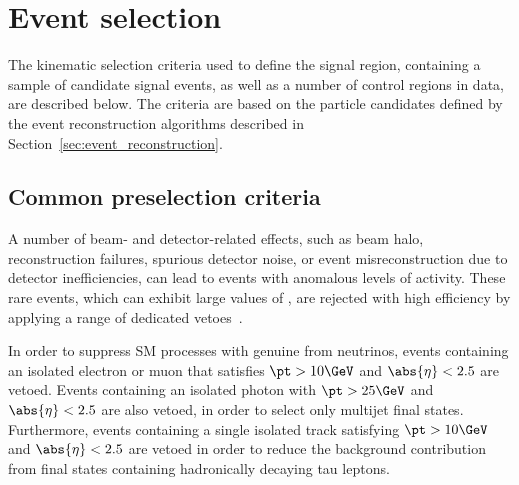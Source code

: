 \section{Event selection}
\label{sec:event_selection}

The kinematic selection criteria used to define the signal region,
containing a sample of candidate signal events, as well as a number of
control regions in data, are described below. The criteria are based
on the particle candidates defined by the event reconstruction
algorithms described in Section~\ref{sec:event_reconstruction}.

\subsection{Common preselection criteria}
\label{sec:preselection}

A number of beam- and detector-related effects, such as beam halo,
reconstruction failures, spurious detector noise, or event
misreconstruction due to detector inefficiencies, can lead to events
with anomalous levels of activity. These rare events, which can
exhibit large values of \ETmiss, are rejected with high efficiency by
applying a range of dedicated vetoes~\cite{1748-0221-5-03-T03014,
  cms-met}.

In order to suppress SM processes with genuine \ptvecmiss from
neutrinos, events containing an isolated electron or muon that
satisfies $\pt > 10\GeV$ and $\abs{\eta} < 2.5$ are vetoed. Events
containing an isolated photon with $\pt > 25\GeV$ and $\abs{\eta} <
2.5$ are also vetoed, in order to select only multijet final
states. Furthermore, events containing a single isolated track
satisfying $\pt > 10\GeV$ and $\abs{\eta} < 2.5$ are vetoed in order
to reduce the background contribution from final states containing
hadronically decaying tau leptons.

